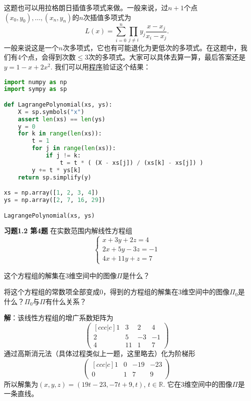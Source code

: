 这题也可以用拉格朗日插值多项式来做。一般来说，过$n+1$个点$(x_0, y_0), \ldots, (x_n, y_n)$的$n$次插值多项式为
$$L(x) = \sum\limits_{i=0}^n \prod\limits_{j \neq i} y_j \dfrac{x-x_j}{x_i-x_j}.$$
一般来说这是一个$n$次多项式，它也有可能退化为更低次的多项式。在这题中，我们有4个点，会得到次数$\leqslant 3$次的多项式。大家可以具体去算一算，最后答案还是$y = 1 - x + 2x^2$. 我们可以用\href{https://github.com/wenh06/buaa-advanced-algebra-2021/blob/master/notebooks/class-1.ipynb}{程序}验证这个结果：
\begin{center}
\begin{lstlisting}[language=Python]
import numpy as np
import sympy as sp

def LagrangePolynomial(xs, ys):
    X = sp.symbols("x")
    assert len(xs) == len(ys)
    y = 0
    for k in range(len(xs)):
        t = 1
        for j in range(len(xs)):
            if j != k:
                t = t * ( (X - xs[j]) / (xs[k] - xs[j]) )
        y += t * ys[k]
    return sp.simplify(y)

xs = np.array([1, 2, 3, 4])
ys = np.array([2, 7, 16, 29])

LagrangePolynomial(xs, ys)
\end{lstlisting}
\end{center}

\newpageorvspace

{\bf 习题1.2 第4题} 在实数范围内解线性方程组
$$\begin{cases}
x + 3y + 2z = 4 \\
2x + 5y -3z = -1 \\
4x + 11y + z = 7
\end{cases}$$

这个方程组的解集在3维空间中的图像$\Pi$是什么？

将这个方程组的常数项全部变成0，得到的方程组的解集在3维空间中的图像$\Pi_0$是什么？$\Pi_0$与$\Pi$有什么关系？

\newpageorvspace

{\bf 解}：该线性方程组的增广系数矩阵为
$$\begin{pmatrix}[ccc|c]
  1 & 3 & 2 & 4\\
  2 & 5 & -3 & -1 \\
  4 & 11 & 1 & 7
\end{pmatrix}$$
通过高斯消元法（具体过程类似上一题，这里略去）化为阶梯形
$$\begin{pmatrix}[ccc|c]
  1 & 0 & -19 & -23\\
  0 & 1 & 7 & 9
\end{pmatrix}$$
所以解集为$(x,y,z) = (19t-23,-7t+9,t)$, $t\in\mathbb{R}$. 它在3维空间中的图像$\Pi$是一条直线。

